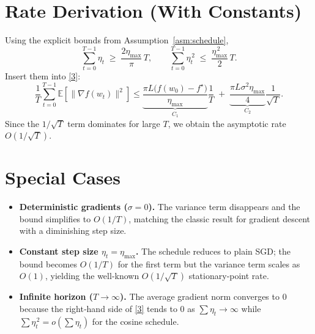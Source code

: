 \documentclass{article}
\begin{document}
\section*{Rate Derivation (With Constants)}
Using the explicit bounds from Assumption~\ref{asm:schedule},
\[
\sum_{t=0}^{T-1}\eta_t\;\ge\;\frac{2\eta_{\max}}{\pi}\,T,
\qquad
\sum_{t=0}^{T-1}\eta_t^{\,2}\;\le\;\frac{\eta_{\max}^{\,2}}{2}\,T .
\]
Insert them into \eqref{3}:
\[
\frac{1}{T}\sum_{t=0}^{T-1}\mathbb{E}\!\left[\|\nabla f(w_t)\|^2\right]
\le
\underbrace{\frac{\pi L\bigl(f(w_0)-f^\star\bigr)}{\eta_{\max}}}_{\displaystyle
C_1}\frac{1}{T}
\;+\;
\underbrace{\frac{\pi L\sigma^2\eta_{\max}}{4}}_{\displaystyle C_2}
\frac{1}{\sqrt{T}} .
\]
Since the $1/\sqrt{T}$ term dominates for large $T$, we obtain the
asymptotic rate $O(1/\sqrt{T})$.

\section*{Special Cases}
\begin{itemize}
  \item \textbf{Deterministic gradients ($\sigma=0$).}
        The variance term disappears and the bound simplifies to
        $O(1/T)$, matching the classic result for gradient descent with a
        diminishing step size.
  \item \textbf{Constant step size $\eta_t=\eta_{\max}$.}
        The schedule reduces to plain SGD; the bound becomes
        $O(1/T)$ for the first term but the variance term scales as
        $O(1)$, yielding the well‑known $O(1/\sqrt{T})$ stationary‑point
        rate.
  \item \textbf{Infinite horizon ($T\to\infty$).}
        The average gradient norm converges to $0$ because the right‑hand
        side of \eqref{3} tends to $0$ as $\sum\eta_t\to\infty$ while
        $\sum\eta_t^{\,2}=o(\sum\eta_t)$ for the cosine schedule.
\end{itemize}
\end{document}
